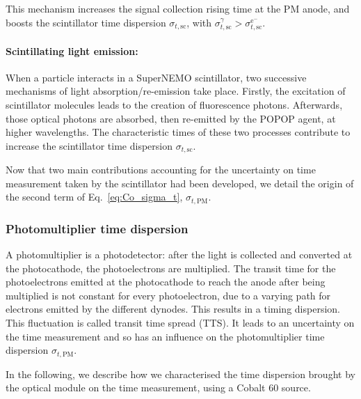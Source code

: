 This mechanism increases the signal collection rising time at the PM anode, and boosts the scintillator time dispersion $\sigma_{t,\text{sc}}$, with $\sigma_{t,\text{sc}}^{\gamma}>\sigma_{t,\text{sc}}^{\text{e}^{-}}$.

\paragraph{Scintillating light emission:}
When a particle interacts in a SuperNEMO scintillator, two successive mechanisms of light absorption/re-emission take place.
Firstly, the excitation of scintillator molecules leads to the creation of fluorescence photons.
Afterwards, those optical photons are absorbed, then re-emitted by the POPOP agent, at higher wavelengths.
The characteristic times of these two processes contribute to increase the scintillator time dispersion $\sigma_{t,\text{sc}}$.

Now that two main contributions accounting for the uncertainty on time measurement taken by the scintillator had been developed, we detail the origin of the second term of Eq.~\eqref{eq:Co_sigma_t}, $\sigma_{t,\text{PM}}$.

\subsubsection*{Photomultiplier time dispersion}

A photomultiplier is a photodetector: after the light is collected and converted at the photocathode, the photoelectrons are multiplied.
The transit time for the photoelectrons emitted at the photocathode to reach the anode after being multiplied is not constant for every photoelectron, due to a varying path for electrons emitted by the different dynodes.
This results in a timing dispersion.
This fluctuation is called transit time spread (TTS).
It leads to an uncertainty on the time measurement and so has an influence on the photomultiplier time dispersion $\sigma_{t,\text{PM}}$.

In the following, we describe how we characterised the time dispersion brought by the optical module on the time measurement, using a Cobalt 60 source.


